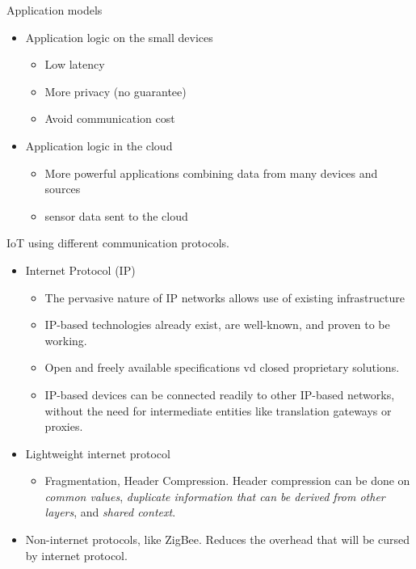 Application models
\begin{itemize}
    \item Application logic on the small devices
    \begin{itemize}
        \item Low latency
        \item More privacy (no guarantee)
        \item Avoid communication cost
    \end{itemize}
    \item Application logic in the cloud
    \begin{itemize}
        \item More powerful applications combining data from many devices and sources
        \item sensor data sent to the cloud
    \end{itemize}
\end{itemize}

IoT using different communication protocols.
\begin{itemize}
    \item Internet Protocol (IP)
    \begin{itemize}
        \item The pervasive nature of IP networks allows use of existing infrastructure
        \item IP-based technologies already exist, are well-known, and proven to be working.
        \item Open and freely available specifications vd closed proprietary solutions.
        \item IP-based devices can be connected readily to other IP-based networks, without the need for intermediate entities like translation gateways or proxies.
    \end{itemize}
    \item Lightweight internet protocol
    \begin{itemize}
        \item Fragmentation, Header Compression. Header compression can be done on \textit{common values}, \textit{duplicate information that can be derived from other layers}, and \textit{shared context}.
    \end{itemize}
    \item Non-internet protocols, like ZigBee. Reduces the overhead that will be cursed by internet protocol.
\end{itemize}